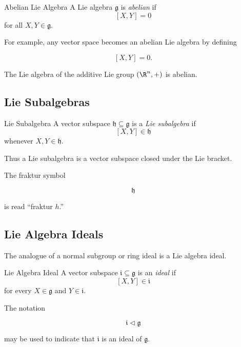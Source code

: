 \begin{definitionbox}{Abelian Lie Algebra}
A Lie algebra \(\mathfrak g\) is \emph{abelian} if
\[ [X,Y]=0 \]
for all \(X,Y\in\mathfrak g\).
\end{definitionbox}

For example, any vector space becomes an abelian Lie algebra by defining

\[ [X,Y]=0. \]

The Lie algebra of the additive Lie group \((\R^n,+)\) is abelian.

\subsection{Lie Subalgebras}
\label{subsec:lie-subalgebras}

\begin{definitionbox}{Lie Subalgebra}
A vector subspace \(\mathfrak h\subseteq\mathfrak g\) is a
\emph{Lie subalgebra} if
\[ [X,Y]\in\mathfrak h \]
whenever \(X,Y\in\mathfrak h\).
\end{definitionbox}

Thus a Lie subalgebra is a vector subspace closed under the Lie bracket.

The fraktur symbol

\[ \mathfrak h \]

is read ``fraktur \(h\).''

\subsection{Lie Algebra Ideals}
\label{subsec:lie-algebra-ideals}

The analogue of a normal subgroup or ring ideal is a Lie algebra ideal.

\begin{definitionbox}{Lie Algebra Ideal}
A vector subspace \(\mathfrak i\subseteq\mathfrak g\) is an \emph{ideal} if
\[ [X,Y]\in\mathfrak i \]
for every \(X\in\mathfrak g\) and \(Y\in\mathfrak i\).
\end{definitionbox}

The notation

\[ \mathfrak i\triangleleft\mathfrak g \]

may be used to indicate that \(\mathfrak i\) is an ideal of
\(\mathfrak g\).

